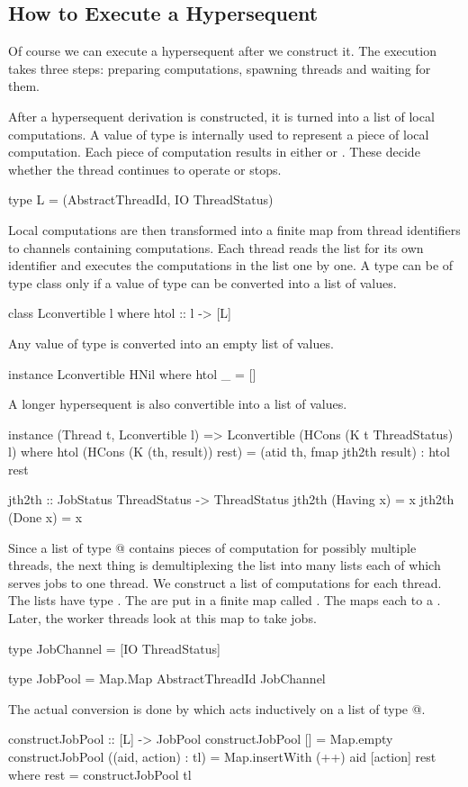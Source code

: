 \subsection{How to Execute a Hypersequent}
Of course we can execute a hypersequent after we construct it.  The
execution takes three steps: preparing computations, spawning
threads and waiting for them.

After a hypersequent derivation is constructed, it is turned into a list
of local computations.  A value of type \verb@L@ is internally used to
represent a piece of
local computation.  Each piece of computation results in either \verb@TryAnotherJob@
or \verb@Finished@.  These decide whether the thread continues to operate or stops.
\begin{code}
type L = (AbstractThreadId, IO ThreadStatus)
\end{code}

Local computations are then transformed into a finite map from thread
identifiers to channels containing computations. Each thread reads the list for
its own identifier and executes the computations in the list one by one.
A type \verb@l@ can be of type class \verb@Lconvertible@ only if
a value of type \verb@l@ can be converted into a list of \verb@L@
values.
\begin{code}
class Lconvertible l where
    htol :: l -> [L]
\end{code}
Any value of type \verb@HNil@ is converted into an empty list of
\verb@L@ values.
\begin{code}
instance Lconvertible HNil where
    htol _ = []
\end{code}
A longer hypersequent is also convertible into a list of \verb@L@ values.
\begin{code}
instance (Thread t, Lconvertible l) =>
 Lconvertible (HCons (K t ThreadStatus) l) where
    htol (HCons (K (th, result)) rest) =
      (atid th, fmap jth2th result) : htol rest

jth2th :: JobStatus ThreadStatus -> ThreadStatus
jth2th (Having x) = x
jth2th (Done x) = x
\end{code}

Since a list of type \verb@[L]@ contains pieces of computation for
possibly multiple threads, the next thing is demultiplexing the list
into many lists each of which serves jobs to one thread.
We construct a list of computations for each thread.  The lists have type
\verb@JobChannel@.  The \verb@JobChannel@s are put in a finite map called
\verb@JobPool@.  The \verb@JobPool@ maps each \verb@AbstractThreadId@ to a
\verb@JobChannel@.  Later, the worker threads look at this map to take
jobs.
\begin{code}
type JobChannel = [IO ThreadStatus]

type JobPool =
    Map.Map AbstractThreadId JobChannel
\end{code}
The actual conversion is done by \verb@constructJobPool@ which acts
inductively on a list of type \verb@[L]@.
\begin{code}
constructJobPool :: [L] -> JobPool
constructJobPool [] = Map.empty
constructJobPool ((aid, action) : tl) =
  Map.insertWith (++) aid [action] rest
     where rest = constructJobPool tl
\end{code}

